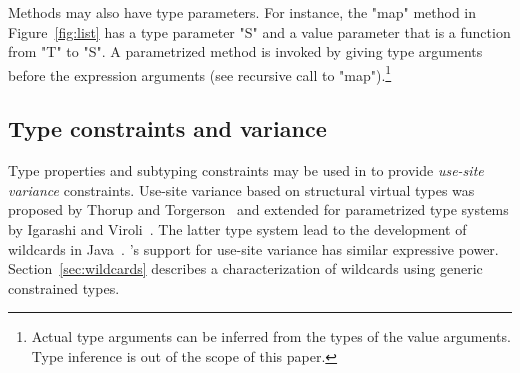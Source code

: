 Methods may also have type parameters.  
For instance, the \xcd"map" method in Figure~\ref{fig:list} 
has a type parameter \xcd"S" and a value parameter that is a
function from \xcd"T" to \xcd"S".
A parametrized method is invoked by giving type arguments before the
expression arguments (see recursive call to
\xcd"map").\footnote{Actual type arguments can be inferred from the types
of the value arguments. Type inference is out of the scope of this paper.}


\subsection{Type constraints and variance}
\label{sec:variance}

Type properties and subtyping constraints may be used in \Xten{} to 
provide \emph{use-site variance}
constraints.
Use-site variance based on structural virtual types was proposed by
Thorup and Torgerson~\cite{unifying-genericity} and extended for
parametrized type systems by Igarashi and
Viroli~\cite{variant-parametric-types}.  The latter type system lead
to the development of wildcards in
Java~\cite{Java3,adding-wildcards,wildcards-safe}.  \Xten's
support for use-site variance
has similar expressive power.
Section~\ref{sec:wildcards} describes a characterization of
wildcards using generic constrained types.

